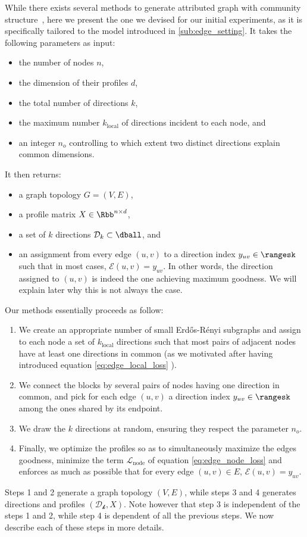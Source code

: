 While there exists several methods to generate attributed graph with community
structure~\autocites{Yang2013}{XuBayesian14}{Kataoka2016}, here we present the one we devised for
our initial experiments, as it is specifically tailored to the model introduced in \autoref{sub:edge_setting}.
It takes the following parameters as input:
\begin{itemize}[nosep]
  \item the number of nodes $n$,
  \item the dimension of their profiles $d$,
  \item the total number of directions $k$,
  \item the maximum number $k_\mathrm{local}$ of directions incident to each node, and
  \item an integer $n_o$ controlling to which extent two distinct directions explain common dimensions.
\end{itemize}
It then returns:
\begin{itemize}[nosep]
  \item a graph topology $G=(V,E)$,
  \item a profile matrix $X\in \Rbb^{n\times d}$,
  \item a set of $k$ directions $\mathcal{D}_k \subset \dball$, and
  \item an assignment from every edge $(u,v)$ to a direction index $y_{uv} \in \rangesk$ such that in
    most cases, $\mathcal{E}(u,v) = y_{uv}$. In other words, the direction assigned to $(u,v)$ is
    indeed the one achieving maximum goodness. We will explain later why this is not always the
    case.
\end{itemize}
Our methods essentially proceeds as follow:
\begin{enumerate}[1),nosep]
  \item We create an appropriate number of small Erdős-Rényi subgraphs and assign to each node a set of
    $k_\mathrm{local}$ directions such that most pairs of adjacent nodes have at least one
    directions in common (as we motivated after having introduced equation \eqref{eq:edge_local_loss}
    ).
  \item We connect the blocks by several pairs of nodes having one direction in common, and pick for
    each edge $(u,v)$ a direction index $y_{uv} \in \rangesk$ among the ones shared by its endpoint.
  \item We draw the $k$ directions at random, ensuring they respect the parameter $n_o$.
  \item Finally, we optimize the profiles so as to simultaneously maximize the edges goodness,
    minimize the term $\mathcal{L}_{\mathrm{node}}$ of equation \eqref{eq:edge_node_loss} and
    enforces as much as possible that for every edge $(u,v) \in E$, $\mathcal{E}(u,v) = y_{uv}$.
\end{enumerate}
Steps 1 and 2 generate a graph topology $(V, E)$, while steps 3 and 4 generates directions and
profiles $(\mathcal{D_k}, X)$. Note however that step 3 is independent of the steps 1 and 2, while
step 4 is dependent of all the previous steps.
We now describe each of these steps in more details.

